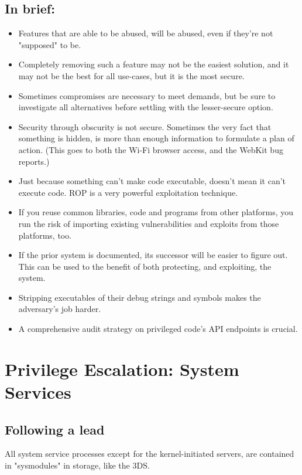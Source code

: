 \documentclass[journal]{IEEEtran}
\begin{document}
\subsection*{In brief:}
\begin{itemize}
\item Features that are able to be abused, will be abused, even if they're not "supposed" to be.
\item Completely removing such a feature may not be the easiest solution, and it may not be the
best for all use-cases, but it is the most secure.
\item Sometimes compromises are necessary to meet demands, but be sure to investigate all
alternatives before settling with the lesser-secure option.
\item Security through obscurity is not secure. Sometimes the very fact that something is hidden,
is more than enough information to formulate a plan of action. (This goes to both the Wi-Fi browser
access, and the WebKit bug reports.)
\item Just because something can't make code executable, doesn't mean it can't execute code. ROP
is a very powerful exploitation technique.
\item If you reuse common libraries, code and programs from other platforms, you run the risk of
importing existing vulnerabilities and exploits from those platforms, too.
\item If the prior system is documented, its successor will be easier to figure out. This can be
used to the benefit of both protecting, and exploiting, the system.
\item Stripping executables of their debug strings and symbols makes the adversary's job harder.
\item A comprehensive audit strategy on privileged code's API endpoints is crucial.
\end{itemize}

\section{Privilege Escalation: System Services}

\subsection{Following a lead}

All system service processes except for the kernel-initiated servers, are contained in "sysmodules"
in storage, like the 3DS.
\end{document}
